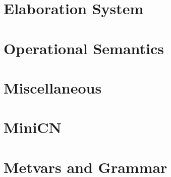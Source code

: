 \documentclass[11pt]{article}%
\begin{document}
\section{Elaboration System}
\cndefnsinfXXres%
\cndefnselabXXaction%
\cndefnselabXXmemop%
\cndefnselabXXspine%
\cndefnselabXXexpr%
\cndefnselab%

\section{Operational Semantics}
\cndefnssubsXXjudge%
\cndefnspureXXopsem%
\cndefnsopsem%

\section{Miscellaneous}
\cndefnsproofXXdefns%
\cndefnsuserXXdefns%
\cndefnsheapXXsat%

\section{MiniCN}
\cndefnsmini%

\section{Metvars and Grammar}
\cnmetavars\\[\baselineskip]
\cngrammar%
\end{document}
